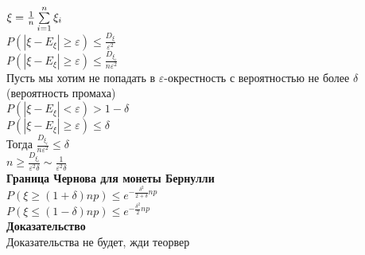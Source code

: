 \documentclass[12pt]{article}
\begin{document}
$\xi = \frac1n \sum\limits_{i=1}^n \xi_i$\\
$P(|\xi-E_\xi| \geq \varepsilon) \leq \frac{D_\xi}{\varepsilon^2}$\\
$P(|\xi-E_\xi| \geq \varepsilon) \leq \frac{D_{\xi_i}}{n\varepsilon^2}$\\
Пусть мы хотим не попадать в $\varepsilon$-окрестность с вероятностью не более $\delta$ (вероятность промаха)\\
$P(|\xi-E_\xi| < \varepsilon) > 1 - \delta$\\
$P(|\xi-E_\xi| \geq \varepsilon) \leq \delta$\\
Тогда $\frac{D_{\xi_i}}{n\varepsilon^2} \leq \delta$\\
$n \geq \frac{D_{\xi_i}}{\varepsilon^2 \delta} \sim \frac1{\varepsilon^2\delta}$\\
\textbf{Граница Чернова для монеты Бернулли}\\
$P(\xi \geq (1+\delta)np) \leq e^{-\frac{\delta^2}{2+\delta}np}$\\
$P(\xi \leq (1-\delta)np) \leq e^{-\frac{\delta^2}2np}$\\
\textbf{Доказательство}\\
Доказательства не будет, жди теорвер\\
\end{document}
